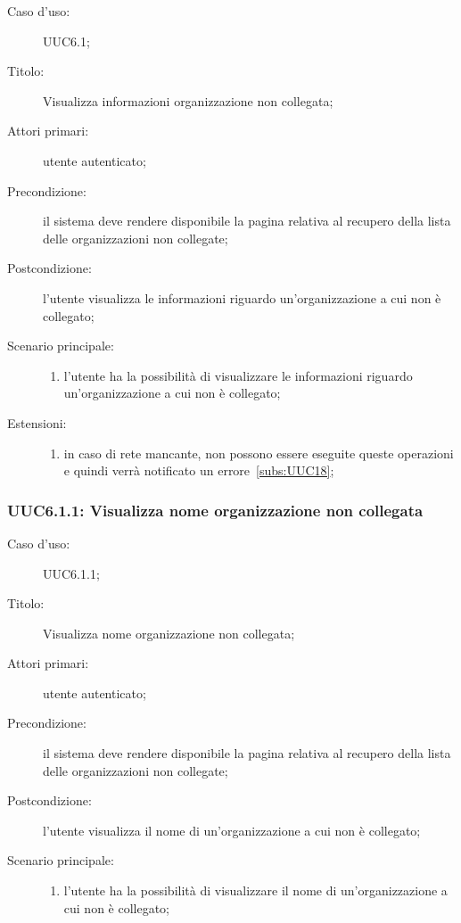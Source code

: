 \documentclass[../../../analisi-dei-requisiti.tex]{subfiles}
\begin{document}
\begin{description}
  \item[Caso d'uso:] UUC6.1;
  \item[Titolo:] Visualizza informazioni organizzazione non collegata;
  \item[Attori primari:] utente autenticato;
  \item[Precondizione:] il sistema deve rendere disponibile la pagina relativa al recupero della lista delle organizzazioni non collegate;
  \item[Postcondizione:] l'utente visualizza le informazioni riguardo un'organizzazione a cui non è collegato;
  \item[Scenario principale:]
        \begin{enumerate}
          \item l'utente ha la possibilità di visualizzare le informazioni riguardo un'organizzazione a cui non è collegato;
        \end{enumerate}
  \item[Estensioni:]
        \begin{enumerate}
          \item in caso di rete mancante, non possono essere eseguite queste operazioni e quindi verrà notificato un errore~\ref{subs:UUC18};
        \end{enumerate}
\end{description}


\subsubsection{UUC6.1.1: Visualizza nome organizzazione non collegata}%
\label{subs:UUC6.1.1}
\begin{description}
  \item[Caso d'uso:] UUC6.1.1;
  \item[Titolo:] Visualizza nome organizzazione non collegata;
  \item[Attori primari:] utente autenticato;
  \item[Precondizione:] il sistema deve rendere disponibile la pagina relativa al recupero della lista delle organizzazioni non collegate;
  \item[Postcondizione:] l'utente visualizza il nome di un'organizzazione a cui non è collegato;
  \item[Scenario principale:]
        \begin{enumerate}
          \item l'utente ha la possibilità di visualizzare il nome di un'organizzazione a cui non è collegato;
        \end{enumerate}
\end{description}
\end{document}
